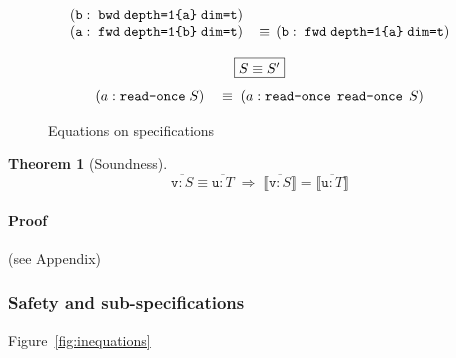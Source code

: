 \documentclass[9pt]{sigplanconf}
\newcounter{block}
\theoremstyle{definition}
\newtheorem{theorem}[block]{Theorem}
\newcommand{\interp}[1]{\llbracket{#1}\rrbracket}
\begin{document}
\begin{figure}
\begin{align*}
\begin{array}{c}
\begin{array}{ll}
(\texttt{b} : \; \texttt{bwd} \; \texttt{depth=1\{a\}} \;
  \texttt{dim=t})
\\
(\texttt{a} : \; \texttt{fwd} \; \texttt{depth=1\{b\}}\;
  \texttt{dim=t})
\, & \equiv \,
(\texttt{b} : \; \texttt{fwd} \; \texttt{depth=1\{a\}} \;
  \texttt{dim=t})
\end{array}
\\ \\
\framebox{$S \equiv S'$} \\[0.75em]
\begin{array}{ll}
(a : \texttt{read-once} \; S) \; & \equiv \; (a : \texttt{read-once} \;\,
  \texttt{read-once} \; \, S)
\end{array}
\end{array}
\end{align*}
\caption{Equations on specifications}
\label{fig:equations}
\end{figure}


\begin{theorem}[Soundness]
\[
\overline{\texttt{v} : S}\equiv \overline{\texttt{u} : T}
\; \Rightarrow \;
\interp{\overline{\texttt{v} : S}} = \interp{\overline{\texttt{u} : T}}
\]
\end{theorem}

\paragraph{Proof} (see Appendix)


\subsubsection{Safety and sub-specifications}

Figure~\ref{fig:inequations}
\end{document}
